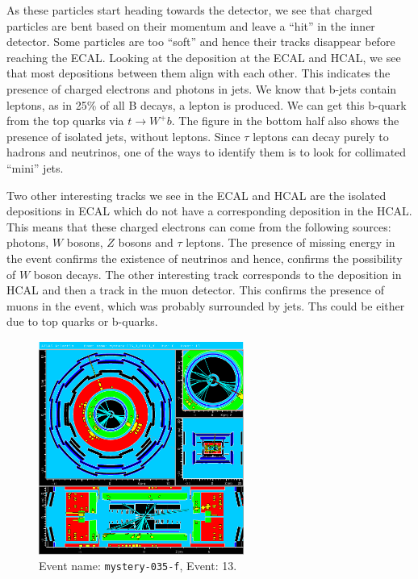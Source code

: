 \documentclass[a4paper]{report}
\numberwithin{equation}{section}
\begin{document}
As these particles start heading towards the detector, we see that charged particles are bent based on their momentum and leave a ``hit'' in the inner detector. Some particles are too ``soft'' and hence their tracks disappear before reaching the ECAL. Looking at the deposition at the ECAL and HCAL, we see that most depositions between them align with each other. This indicates the presence of charged electrons and photons in jets. We know that b-jets contain leptons, as in 25\% of all B decays, a lepton is produced. We can get this b-quark from the top quarks via $t \rightarrow W^+ b$. The figure in the bottom half also shows the presence of isolated jets, without leptons. Since $\tau$ leptons can decay purely to hadrons and neutrinos, one of the ways to identify them is to look for collimated ``mini'' jets. 
 
Two other interesting tracks we see in the ECAL and HCAL are the isolated depositions in ECAL which do not have a corresponding deposition in the HCAL. This means that these charged electrons can come from the following sources: photons, $W$ bosons, $Z$ bosons and $\tau$ leptons. The presence of missing energy in the event confirms the existence of neutrinos and hence, confirms the possibility of $W$ boson decays. The other interesting track corresponds to the deposition in HCAL and then a track in the muon detector. This confirms the presence of muons in the event, which was probably surrounded by jets. Ths could be either due to top quarks or b-quarks. 

\begin{figure}[htpb]
    \centering
    \includegraphics[width=0.6\textwidth]{mystery-035_0_00013_f-YX-RZ-RZ-YX-2022-05-23-13-28-39}
    \caption{Event name: \texttt{mystery-035-f}, Event: 13.}
    \label{fig:mys1}
\end{figure}
\end{document}

